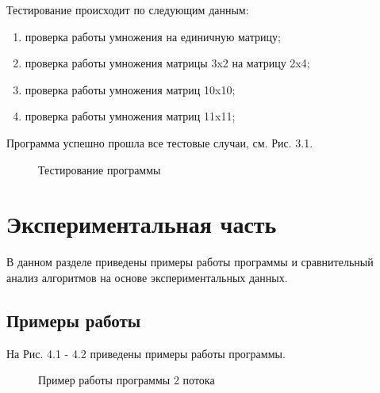\documentclass[12pt]{report}
\begin{document}
Тестирование происходит по следующим данным:
\begin{enumerate}
	\item проверка работы умножения на единичную матрицу;
	\item проверка работы умножения матрицы 3x2 на матрицу 2x4;
	\item проверка работы умножения матриц 10x10;
	\item проверка работы умножения матриц 11x11;
\end{enumerate}

Программа успешно прошла все тестовые случаи, см. Рис. 3.1. 

\begin{figure}[h]
	\caption{Тестирование программы}
	\label{figure:image}
\end{figure}

\chapter{Экспериментальная часть}

В данном разделе приведены примеры работы программы и сравнительный анализ алгоритмов на основе экспериментальных данных. 

\section{Примеры работы} 

На Рис. 4.1 - 4.2 приведены примеры работы программы.

\begin{figure}[h]
	\caption{Пример работы программы 2 потока}
	\label{figure:image}
\end{figure}
\end{document}
